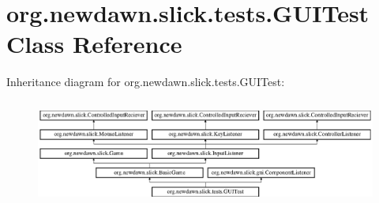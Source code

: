 \hypertarget{classorg_1_1newdawn_1_1slick_1_1tests_1_1_g_u_i_test}{}\section{org.\+newdawn.\+slick.\+tests.\+G\+U\+I\+Test Class Reference}
\label{classorg_1_1newdawn_1_1slick_1_1tests_1_1_g_u_i_test}
Inheritance diagram for org.\+newdawn.\+slick.\+tests.\+G\+U\+I\+Test\+:\begin{figure}[H]
\begin{center}
\leavevmode
\includegraphics[height=3.522012cm]{classorg_1_1newdawn_1_1slick_1_1tests_1_1_g_u_i_test}
\end{center}
\end{figure}
